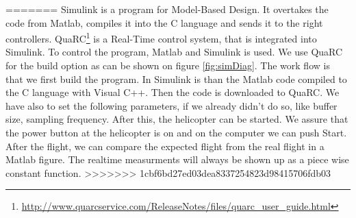 =======
Simulink is a program for Model-Based Design. It overtakes the code from Matlab, compiles it into the C language and sends it to the right controllers. QuaRC\footnote{\url{http://www.quarcservice.com/ReleaseNotes/files/quarc_user_guide.html}} is a Real-Time control system, that is integrated into Simulink. To control the program, Matlab and Simulink is used. We use QuaRC for the build option as can be shown on figure \ref{fig:simDiag}. 
The work flow is that we first build the program. In Simulink is than the Matlab code compiled to the C language with Visual C++. Then the code is downloaded to QuaRC. We have also to set the following parameters, if we already didn't do so, like buffer size, sampling frequency. After this, the helicopter can be started. We assure that the power button at the helicopter is on and on the computer we can push Start. After the flight, we can compare the expected flight from the real flight in a Matlab figure. The realtime measurments will always be shown up as a piece wise constant function. 
>>>>>>> 1cbf6bd27ed03dea8337254823d98415706fdb03
